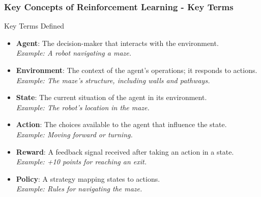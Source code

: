 \documentclass[aspectratio=169]{beamer}
\begin{document}
\begin{frame}[fragile]
    \frametitle{Key Concepts of Reinforcement Learning - Key Terms}
    \begin{block}{Key Terms Defined}
        \begin{itemize}
            \item \textbf{Agent}: The decision-maker that interacts with the environment. \\
                  \textit{Example: A robot navigating a maze.}
            \item \textbf{Environment}: The context of the agent's operations; it responds to actions. \\
                  \textit{Example: The maze's structure, including walls and pathways.}
            \item \textbf{State}: The current situation of the agent in its environment. \\
                  \textit{Example: The robot's location in the maze.}
            \item \textbf{Action}: The choices available to the agent that influence the state. \\
                  \textit{Example: Moving forward or turning.}
            \item \textbf{Reward}: A feedback signal received after taking an action in a state. \\
                  \textit{Example: +10 points for reaching an exit.}
            \item \textbf{Policy}: A strategy mapping states to actions. \\
                  \textit{Example: Rules for navigating the maze.}
        \end{itemize}
    \end{block}
\end{frame}
\end{document}
